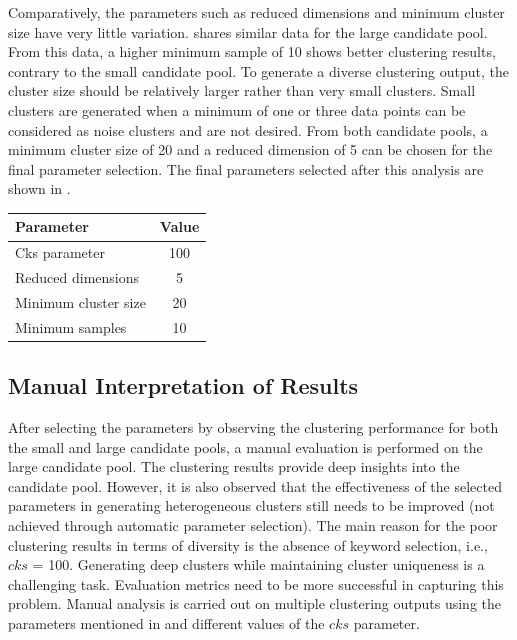 Comparatively, the parameters such as reduced dimensions and minimum cluster size have very little variation.  shares similar data for the large candidate pool. From this data, a higher minimum sample of 10 shows better clustering results, contrary to the small candidate pool. To generate a diverse clustering output, the cluster size should be relatively larger rather than very small clusters. Small clusters are generated when a minimum of one or three data points can be considered as noise clusters and are not desired. From both candidate pools, a minimum cluster size of 20 and a reduced dimension of 5 can be chosen for the final parameter selection. The final parameters selected after this analysis are shown in .


\begin{center}
	\label{tab:ideal_parameters}
	\begin{tabularx}{.4\textwidth}{|Y|c|}
		\hline
		   Parameter & Value\\
		\hline
		
	        Cks parameter &          100 \\ \hline
		       Reduced dimensions &          5 \\ \hline
         Minimum cluster size &          20 \\ \hline
	        Minimum samples &          10 \\ \hline
		
	\end{tabularx}
	
\end{center}


\subsection{Manual Interpretation of Results}

After selecting the parameters by observing the clustering performance for both the small and large candidate pools, a manual evaluation is performed on the large candidate pool. The clustering results provide deep insights into the candidate pool. However, it is also observed that the effectiveness of the selected parameters in generating heterogeneous clusters still needs to be improved (not achieved through automatic parameter selection). The main reason for the poor clustering results in terms of diversity is the absence of keyword selection, i.e., $cks$ = 100. Generating deep clusters while maintaining cluster uniqueness is a challenging task. Evaluation metrics need to be more successful in capturing this problem. Manual analysis is carried out on multiple clustering outputs using the parameters mentioned in  and different values of the $cks$ parameter.
 
